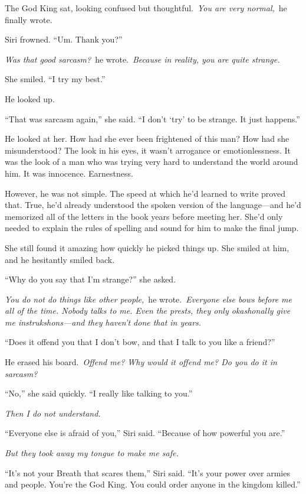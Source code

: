 The God King sat, looking confused but thoughtful.~\textit{You are very normal,}~he finally wrote.

Siri frowned. “Um. Thank you?”

\textit{Was that good sarcasm?}~he wrote.~\textit{Because in reality, you are quite strange.}

She smiled. “I try my best.”

He looked up.

“That was sarcasm again,” she said. “I don’t ‘try’ to be strange. It just happens.”

He looked at her. How had she ever been frightened of this man? How had she misunderstood? The look in his eyes, it wasn’t arrogance or emotionlessness. It was the look of a man who was trying very hard to understand the world around him. It was innocence. Earnestness.

However, he was not simple. The speed at which he’d learned to write proved that. True, he’d already understood the spoken version of the language—and he’d memorized all of the letters in the book years before meeting her. She’d only needed to explain the rules of spelling and sound for him to make the final jump.

She still found it amazing how quickly he picked things up. She smiled at him, and he hesitantly smiled back.

“Why do you say that I’m strange?” she asked.

\textit{You do not do things like other people,}~he wrote.~\textit{Everyone else bows before me all of the time. Nobody talks to me. Even the prests, they only okashonally give me instrukshons—and they haven’t done that in years.}

“Does it offend you that I don’t bow, and that I talk to you like a friend?”

He erased his board.~\textit{Offend me? Why would it offend me? Do you do it in sarcasm?}

“No,” she said quickly. “I really like talking to you.”

\textit{Then I do not understand.}

“Everyone else is afraid of you,” Siri said. “Because of how powerful you are.”

\textit{But they took away my tongue to make me safe.}

“It’s not your Breath that scares them,” Siri said. “It’s your power over armies and people. You’re the God King. You could order anyone in the kingdom killed.”

